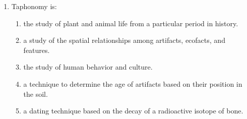 \documentclass[12pt]{article}
\begin{document}
\begin{enumerate}[label=\arabic*.]
\begin{enumerate}[label=(\alph*)]
    \item the early migrants were not human.
    \item the early migrants did not contribute to the genetic pool of modern Native Americans.
    \item the early migrants were a separate species.
    \item craniometrics is an unreliable method of tracking populations.
    \item skull shapes can change dramatically over generations.
\end{enumerate}
\item Taphonomy is:
\begin{enumerate}[label=(\alph*)]
    \item the study of plant and animal life from a particular period in history.
    \item a study of the spatial relationships among artifacts, ecofacts, and features.
    \item the study of human behavior and culture.
    \item a technique to determine the age of artifacts based on their position in the soil.
    \item a dating technique based on the decay of a radioactive isotope of bone.
\end{enumerate}
\end{enumerate}
\end{document}

